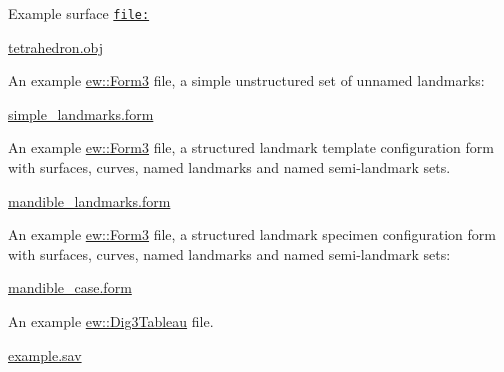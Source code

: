 Example surface \href{file:}{\tt file:}
\begin{DoxyItemize}
\item \hyperlink{tetrahedron_8obj}{tetrahedron.obj}
\end{DoxyItemize}

An example \hyperlink{classew_1_1Form3}{ew::Form3} file, a simple unstructured set of unnamed landmarks:
\begin{DoxyItemize}
\item \hyperlink{simple_landmarks_8form}{simple\_\-landmarks.form}
\end{DoxyItemize}

An example \hyperlink{classew_1_1Form3}{ew::Form3} file, a structured landmark template configuration form with surfaces, curves, named landmarks and named semi-\/landmark sets.
\begin{DoxyItemize}
\item \hyperlink{mandible_template_8form}{mandible\_\-landmarks.form}
\end{DoxyItemize}

An example \hyperlink{classew_1_1Form3}{ew::Form3} file, a structured landmark specimen configuration form with surfaces, curves, named landmarks and named semi-\/landmark sets:
\begin{DoxyItemize}
\item \hyperlink{mandible_case_8form}{mandible\_\-case.form}
\end{DoxyItemize}

An example \hyperlink{classew_1_1Dig3Tableau}{ew::Dig3Tableau} file.
\begin{DoxyItemize}
\item \hyperlink{example_8sav}{example.sav} 
\end{DoxyItemize}